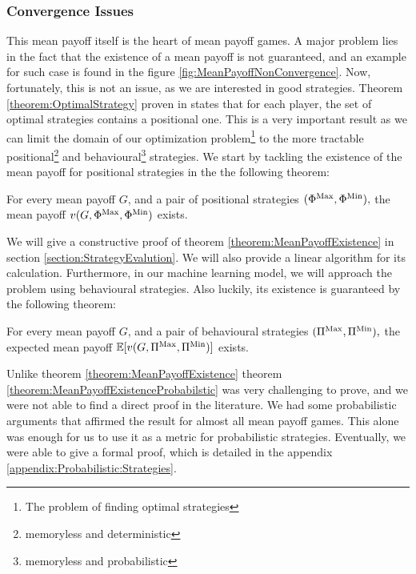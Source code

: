 \subsubsection{Convergence Issues}
This mean payoff itself is the heart of mean payoff games. A major problem lies in the fact that the existence of a mean payoff is not guaranteed, and an example for such case is found in the \newline figure \ref{fig:MeanPayoffNonConvergence}.
\newline Now, fortunately, this is not an issue, as we are interested in good strategies. Theorem \ref{theorem:OptimalStrategy} proven in \cite{PositionalStrategies} states that for each player, the set of optimal strategies contains a positional one. This is a very important result as we can limit the domain of our optimization problem\footnote{The problem of finding optimal strategies} to the more tractable positional\footnote{memoryless and deterministic} and behavioural\footnote{memoryless and probabilistic} strategies.
\newline We start by tackling the existence of the mean payoff for positional strategies in the the following theorem:
\begin{theorem}
	\label{theorem:MeanPayoffExistence}
	For every mean payoff $G$, and a pair of positional strategies $(\Phi^{\operatorname{Max}},\Phi^{\operatorname{Min}}),$ the mean payoff $v(G,\Phi^{\operatorname{Max}},\Phi^{\operatorname{Min}})$ exists.
\end{theorem}
We will give a constructive proof of theorem \ref{theorem:MeanPayoffExistence} in section \ref{section:StrategyEvalution}. We will also provide a linear algorithm for its calculation.
\newline Furthermore, in our machine learning model, we will approach the problem using behavioural strategies. Also luckily, its existence is guaranteed by the following theorem:
\begin{theorem}
	\label{theorem:MeanPayoffExistenceProbabilstic}
	For every mean payoff $G$, and a pair of behavioural strategies $(\Pi^{\operatorname{Max}},\Pi^{\operatorname{Min}}),$ the expected mean payoff $\mathbb{E}[v(G,\Pi^{\operatorname{Max}},\Pi^{\operatorname{Min}})]$ exists.
\end{theorem}
Unlike theorem \ref{theorem:MeanPayoffExistence} theorem \ref{theorem:MeanPayoffExistenceProbabilstic} was very challenging to prove, and we were not able to find a direct proof in the literature. We had some probabilistic arguments that affirmed the result for almost all mean payoff games. This alone was enough for us to use it as a metric for probabilistic strategies.
\newline Eventually, we were able to give a formal proof, which is detailed in the appendix \ref{appendix:Probabilistic:Strategies}.
